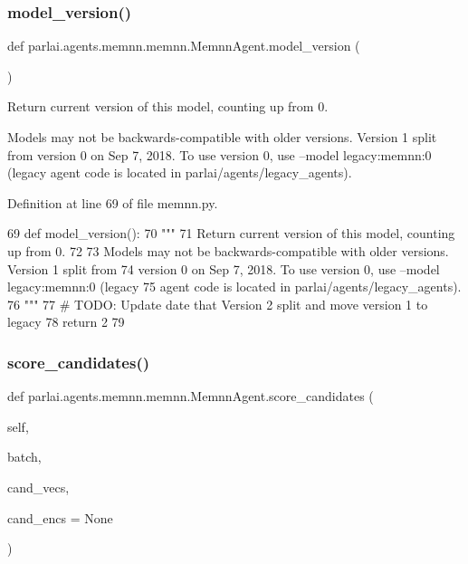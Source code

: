\subsubsection{\texorpdfstring{model\+\_\+version()}{model\_version()}}
{\footnotesize\ttfamily def parlai.\+agents.\+memnn.\+memnn.\+Memnn\+Agent.\+model\+\_\+version (\begin{DoxyParamCaption}{ }\end{DoxyParamCaption})\hspace{0.3cm}{\ttfamily [static]}}

\begin{DoxyVerb}Return current version of this model, counting up from 0.

Models may not be backwards-compatible with older versions. Version 1 split from
version 0 on Sep 7, 2018. To use version 0, use --model legacy:memnn:0 (legacy
agent code is located in parlai/agents/legacy_agents).
\end{DoxyVerb}
 

Definition at line 69 of file memnn.\+py.


\begin{DoxyCode}
69     \textcolor{keyword}{def }model\_version():
70         \textcolor{stringliteral}{"""}
71 \textcolor{stringliteral}{        Return current version of this model, counting up from 0.}
72 \textcolor{stringliteral}{}
73 \textcolor{stringliteral}{        Models may not be backwards-compatible with older versions. Version 1 split from}
74 \textcolor{stringliteral}{        version 0 on Sep 7, 2018. To use version 0, use --model legacy:memnn:0 (legacy}
75 \textcolor{stringliteral}{        agent code is located in parlai/agents/legacy\_agents).}
76 \textcolor{stringliteral}{        """}
77         \textcolor{comment}{# TODO: Update date that Version 2 split and move version 1 to legacy}
78         \textcolor{keywordflow}{return} 2
79 
\end{DoxyCode}
\mbox{\label{classparlai_1_1agents_1_1memnn_1_1memnn_1_1MemnnAgent_a10b5418eda4da7bc85913e24e5b5a029}} 
\subsubsection{\texorpdfstring{score\+\_\+candidates()}{score\_candidates()}}
{\footnotesize\ttfamily def parlai.\+agents.\+memnn.\+memnn.\+Memnn\+Agent.\+score\+\_\+candidates (\begin{DoxyParamCaption}\item[{}]{self,  }\item[{}]{batch,  }\item[{}]{cand\+\_\+vecs,  }\item[{}]{cand\+\_\+encs = {\ttfamily None} }\end{DoxyParamCaption})}



